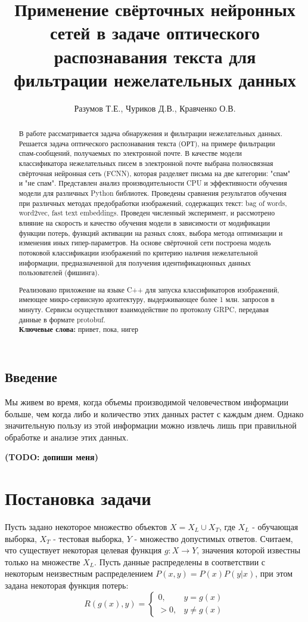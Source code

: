 \documentclass[12pt]{article}
\title{Применение свёрточных нейронных сетей в задаче оптического распознавания текста для фильтрации нежелательных данных}
\author{Разумов Т.Е., Чуриков Д.В., Кравченко О.В.}
\begin{document}
\maketitle

\begin{abstract}
В работе рассматривается задача обнаружения и фильтрации нежелательных данных. Решается задача оптического распознавания текста (ОРТ), на примере фильтрации спам-сообщений, получаемых по электронной почте. В качестве модели классификатора нежелательных писем в электронной почте выбрана полносвязная свёрточная нейронная сеть (FCNN), которая разделяет письма на две категории: "спам" и "не спам". Представлен анализ производительности CPU и эффективности обучения модели для различных Python библиотек. Проведены сравнения результатов обучения при различных методах предобработки изображений, содержащих текст: bag of words, word2vec, fast text embeddings. Проведен численный эксперимент, и рассмотрено влияние на скорость и качество обучения модели в зависимости от модификации функции потерь, функций активации на разных слоях, выбора метода оптимизации и изменения иных гипер-параметров. На основе свёрточной сети построена модель потоковой классификации изображений по критерию наличия нежелательной информации, предназначенной для получения идентификационных данных пользователей (фишинга).


Реализовано приложение на языке C++ для запуска классификаторов изображений, имеющее микро-сервисную архитектуру, выдерживающее более 1 млн. запросов в минуту. Сервисы осуществляют взаимодействие по протоколу GRPC, передавая данные в формате protobuf.\\
\textbf{Ключевые слова:} привет, пока, нигер
\end{abstract}


\subsection*{Введение}
Мы живем во время, когда объемы производимой человечеством
информации больше, чем когда либо и количество этих данных растет с каждым
днем. Однако значительную пользу из этой информации можно извлечь лишь
при правильной обработке и анализе этих данных.

{\bf\color{amaranth} (TODO: допиши меня)}


\section{Постановка задачи}
Пусть задано некоторое множество объектов $ X = X_L \cup X_T $, где $X_L$ - обучающая выборка, $X_T$ - тестовая выборка, $Y$ - множество допустимых ответов. Считаем, что существует некоторая целевая функция $g: X \rightarrow Y$, значения которой известны только на множестве $X_L$. Пусть данные распределены в соответствии с некоторым неизвестным распределением $P(x,y) = P(x) P(y|x)$, при этом задана некоторая функция потерь: 
$$
R(g(x), y) = 
\begin{cases} 
0, & y = g(x) \\
> 0, & y \neq g(x)
\end{cases}
$$
\end{document}
